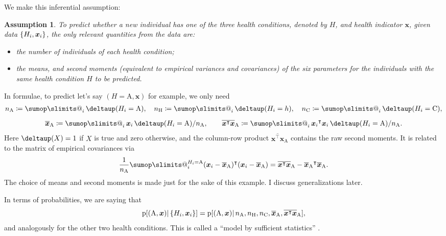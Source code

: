 \documentclass[\ifafour a4paper,12pt,\else a5paper,10pt,\fi%
onecolumn,oneside,article,%
british%
]{memoir}
\makeatletter
\theoremstyle{remark}
\theoremstyle{innote}
\def\sum{\DOTSI\sumop\slimits@}
\newcommand*{\citep}{\parencites}
\newcommand*{\delt}{\deltaup}%
\newcommand*{\defd}{\coloneqq}
\DeclarePairedDelimiter\set{\{}{\}}
\newcommand*{\pf}{\mathrm{p}}%
\renewcommand*{\|}{\mathpunct{|}}
\newcommand*{\chap}{ch.}%
\newcommand*{\tsum}{\mathop{\textstyle\sum}\nolimits}
\newcommand*{\T}{^\intercal}%
\newcommand*{\yH}{H}
\newcommand*{\yh}{h}
\newcommand*{\yx}{x}
\newcommand*{\yxx}{\bm{\yx}}
\newcommand*{\ya}{\mathrm{A}}
\newcommand*{\yi}{\mathrm{C}}
\newcommand*{\yhe}{\mathrm{H}}
\newcommand*{\yn}{n}
\newcommand*{\yna}{\yn_{\ya}}
\newcommand*{\ynh}{\yn_{\yhe}}
\newcommand*{\yni}{\yn_{\yi}}
\newcommand*{\vxxa}{\overline{\yxx}_{\ya}}
\newcommand*{\vxta}{\overline{\yxx\T\yxx}_{\ya}}
\theoremstyle{plain}
\newtheorem*{assumption}{Assumption}
\makeatother
\begin{document}
We make this inferential assumption:
\begin{assumption}
  \label{thm:assumption}
  To predict whether a new individual has one of the three health
  conditions, denoted by $\yH$, and health indicator $\yxx$, given data
  $\set{\yH_i,\yxx_i}$, the only relevant quantities from the data are:
  \begin{itemize}
  \item the  number of individuals of each health condition;
  \item the means, and second moments (equivalent to empirical variances
    and covariances) of the six parameters for the individuals with the
    \emph{same} health condition $\yH$ to be predicted.
  \end{itemize}
\end{assumption}
In formulae, to predict let's say $(\yH=\ya, \yxx)$ for example, we only
need
\begin{equation}
    \label{eq:assumption}
    \begin{gathered}
      \yna \defd \tsum_i \delt(\yH_i=\ya),
\quad      \ynh \defd \tsum_i \delt(\yH_i=\yh),
\quad      \yni \defd \tsum_i \delt(\yH_i=\yi),
      \\[2\jot]
      \vxxa \defd \tsum_i \yxx_i\, \delt(\yH_i=\ya)/\yna,
\qquad      \vxta \defd \tsum_i {\yxx_i}\T\yxx_i \, \delt(\yH_i=\ya)/\yna.
    \end{gathered}
\end{equation}
Here $\delt(X)=1$ if $X$ is true and zero otherwise, and the column-row
product $\vxta$ contains the raw second moments. It is related to the
matrix of empirical covariances via
\begin{equation}
  \label{eq:raw_moments_to_covariances}
  \frac{1}{\yna}\sum_i^{\yH_i=\ya}(\yxx_i-\vxxa)\T(\yxx_i-\vxxa) =
  \vxta - {\vxxa}\T\vxxa.
\end{equation}
The choice of means and second moments is made just for the sake of this
example. I discuss generalizations later.

In terms of probabilities, we are saying that
\begin{equation}
  \label{eq:assumption_probability}
  \pf[(\ya,\yxx) \| \set{\yH_i,\yxx_i}] =
  \pf[(\ya,\yxx) \|
  \yna,\ynh,\yni,\vxxa,\vxta ],
\end{equation}
and analogously for the other two health conditions. This is called a
\enquote{model by sufficient statistics}
\citep[\chap~4]{bernardoetal1994_r2000}.


\bigskip
\end{document}

